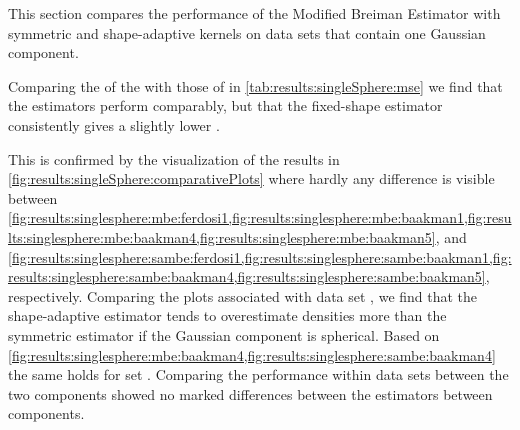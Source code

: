 
This section compares the performance of the Modified Breiman Estimator with symmetric and shape-adaptive kernels on data sets that contain one Gaussian component.
	\begin{table}
		\centering
		
		\caption{\Mses of the estimator with fixed-shape (\mbe) and shape-adaptive (\sambe) kernels on data set \ferdosiOne through \baakmanFive.}
		\label{tab:results:singleSphere:mse}
	\end{table}
	Comparing the \mses of the \mbe with those of \sambe in \cref{tab:results:singleSphere:mse} we find that the estimators perform comparably, but that the fixed-shape estimator consistently gives a slightly lower \mse.

	\begin{figure*}
		\centering
		
		\caption{The density as estimated by \mbe and \sambe as a function of the known density of data sets \ferdosiOne through \baakmanFive.}
		\label{fig:results:singleSphere:comparativePlots}
	\end{figure*}
	This is confirmed by the visualization of the results in \cref{fig:results:singleSphere:comparativePlots} where hardly any difference is visible between \cref{fig:results:singlesphere:mbe:ferdosi1,fig:results:singlesphere:mbe:baakman1,fig:results:singlesphere:mbe:baakman4,fig:results:singlesphere:mbe:baakman5}, and \cref{fig:results:singlesphere:sambe:ferdosi1,fig:results:singlesphere:sambe:baakman1,fig:results:singlesphere:sambe:baakman4,fig:results:singlesphere:sambe:baakman5}, respectively.
		Comparing the plots associated with data set \ferdosiOne, we find that the shape-adaptive estimator tends to overestimate densities more than the symmetric estimator if the Gaussian component is spherical.
		Based on \cref{fig:results:singlesphere:mbe:baakman4,fig:results:singlesphere:sambe:baakman4} the same holds for set \baakmanFour.
	Comparing the performance within data sets between the two components showed no marked differences between the estimators between components.

